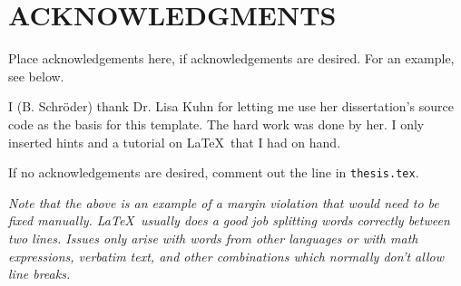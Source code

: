 \chapter*{ACKNOWLEDGMENTS}

Place acknowledgements here, if acknowledgements are desired.
For an example, see below.

I (B. Schr\"oder) thank Dr. Lisa Kuhn for letting me use her
dissertation's source code as the basis for this template.
The hard work was done by her. I only inserted hints and a
tutorial on \LaTeX \
that I had on hand.


If no acknowledgements are desired, comment out
the line
\verb++
in \verb+thesis.tex+.

{\em 
Note that the above is an example of a margin violation 
that would need to be fixed manually. \LaTeX \ 
usually does a good job splitting words correctly between two lines. 
Issues only arise with words from other languages or with 
math expressions, verbatim text, and other combinations 
which normally don't allow line breaks.
}